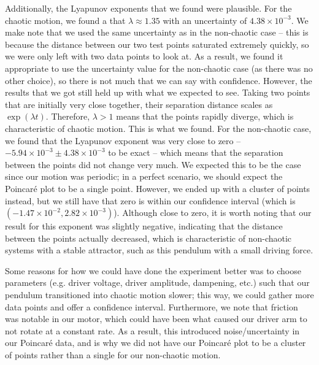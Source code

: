 \documentclass[twocolumn,amsmath,amssymb,pra, floatfix]{revtex4-2}
\begin{document}
Additionally, the Lyapunov exponents that we found were plausible. For the chaotic motion, we found a that $\lambda \approx 1.35$ with an uncertainty of $4.38 \times 10^{-3}$. We make note that we used the same uncertainty as in the non-chaotic case -- this is because the distance between our two test points saturated extremely quickly, so we were only left with two data points to look at. As a result, we found it appropriate to use the uncertainty value for the non-chaotic case (as there was no other choice), so there is not much that we can say with confidence. However, the results that we got still held up with what we expected to see. Taking two points that are initially very close together, their separation distance scales as $\exp(\lambda t)$. Therefore, $\lambda > 1$ means that the points rapidly diverge, which is characteristic of chaotic motion. This is what we found. For the non-chaotic case, we found that the Lyapunov exponent was very close to zero -- $-5.94 \times 10^{-3} \pm 4.38 \times 10^{-3}$ to be exact -- which means that the separation between the points did not change very much. We expected this to be the case since our motion was periodic; in a perfect scenario, we should expect the Poincar\'{e} plot to be a single point. However, we ended up with a cluster of points instead, but we still have that zero is within our confidence interval (which is $( -1.47 \times 10^{-2}, 2.82 \times 10^{-3})$). Although close to zero, it is worth noting that our result for this exponent was slightly negative, indicating that the distance between the points actually decreased, which is characteristic of non-chaotic systems with a stable attractor, such as this pendulum with a small driving force. 

Some reasons for how we could have done the experiment better was to choose parameters (e.g. driver voltage, driver amplitude, dampening, etc.) such that our pendulum transitioned into chaotic motion slower; this way, we could gather more data points and offer a confidence interval. Furthermore, we note that friction was notable in our motor, which could have been what caused our driver arm to not rotate at a constant rate. As a result, this introduced noise/uncertainty in our Poincar\'{e} data, and is why we did not have our Poincar\'{e} plot to be a cluster of points rather than a single for our non-chaotic motion.
\end{document}
